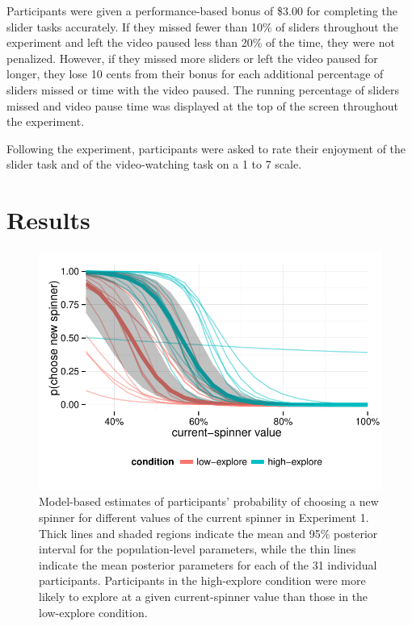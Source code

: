 \documentclass[10pt,letterpaper]{article}
\begin{document}
Participants were given a performance-based bonus of \$3.00 for completing the
slider tasks accurately. If they missed fewer than 10\% of sliders throughout
the experiment and left the video paused less than 20\% of the time, they were
not penalized. However, if they missed more sliders or left the video paused for
longer, they lose 10 cents from their bonus for each additional percentage of
sliders missed or time with the video paused. The running percentage of sliders
missed and video pause time was displayed at the top of the screen throughout
the experiment.

Following the experiment, participants were asked to rate their enjoyment of the
slider task and of the video-watching task on a 1 to 7 scale.


\section{Results}


\begin{figure}
\centering
\includegraphics[width=\columnwidth]{figures/exp1results.pdf}
\caption{Model-based estimates of participants' probability of choosing a new
  spinner for different values of the current spinner in Experiment 1. Thick
  lines and shaded regions indicate the mean and 95\% posterior interval for the
  population-level parameters, while the thin lines indicate the mean posterior
  parameters for each of the 31 individual participants. Participants in the
  high-explore condition were more
  likely to explore at a given current-spinner value than those in the
  low-explore condition.}
\label{fig:exp1results}
\end{figure}
\end{document}
